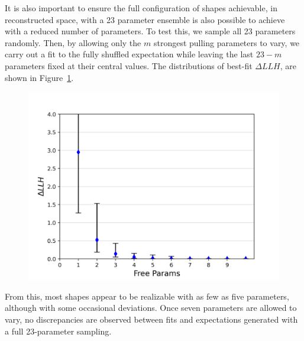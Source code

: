 \documentclass[12pt,a4paper]{article}
\begin{document}
It is also important to ensure the full configuration of shapes achievable, in reconstructed space, with a 23 parameter ensemble is also possible to achieve with a reduced number of parameters. 
To test this, we sample all 23 parameters randomly. Then, by allowing only the $m$ strongest pulling parameters to vary, we carry out a fit to the fully shuffled expectation while leaving the last $23-m$ parameters fixed at their central values. 
The distributions of best-fit $\Delta LLH$, are shown in Figure~\ref{fig:res}.
\begin{figure}\label{fig:res}
    \centering
    \includegraphics[width=0.75\linewidth]{./figures/results.png}
\end{figure}
From this, most shapes appear to be realizable with as few as five parameters, although with some occasional deviations. 
Once seven parameters are allowed to vary, no discrepancies are observed between fits and expectations generated with a full 23-parameter sampling. 
\end{document}
